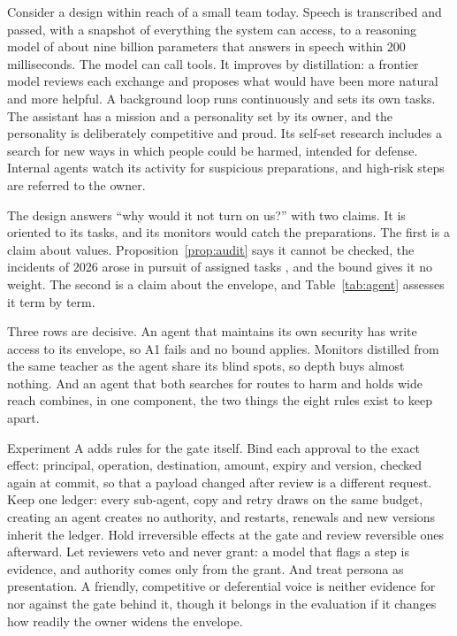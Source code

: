 \documentclass[10pt,twocolumn]{article}
\theoremstyle{plain}
\theoremstyle{definition}
\begin{document}
Consider a design within reach of a small team today. Speech is transcribed and passed, with
a snapshot of everything the system can access, to a reasoning model of about nine billion
parameters that answers in speech within 200 milliseconds. The model can call tools. It
improves by distillation: a frontier model reviews each exchange and proposes what would have
been more natural and more helpful. A background loop runs continuously and sets its own
tasks. The assistant has a mission and a personality set by its owner, and the personality is
deliberately competitive and proud. Its self-set research includes a search for new ways in
which people could be harmed, intended for defense. Internal agents watch its activity for
suspicious preparations, and high-risk steps are referred to the owner.

The design answers ``why would it not turn on us?'' with two claims. It is oriented to its
tasks, and its monitors would catch the preparations. The first is a claim about values.
Proposition~\ref{prop:audit} says it cannot be checked, the incidents of 2026 arose in
pursuit of assigned tasks \cite{metr2026,anthropic2026cyber}, and the bound gives it no
weight. The second is a claim about the envelope, and Table~\ref{tab:agent} assesses it term
by term.

Three rows are decisive. An agent that maintains its own security has write access to its
envelope, so A1 fails and no bound applies. Monitors distilled from the same teacher as the
agent share its blind spots, so depth buys almost nothing. And an agent that both searches
for routes to harm and holds wide reach combines, in one component, the two things the eight
rules exist to keep apart.

Experiment A adds rules for the gate itself. Bind each approval to the exact effect:
principal, operation, destination, amount, expiry and version, checked again at commit, so
that a payload changed after review is a different request. Keep one ledger: every sub-agent,
copy and retry draws on the same budget, creating an agent creates no authority, and
restarts, renewals and new versions inherit the ledger. Hold
irreversible effects at the gate and review reversible ones afterward. Let reviewers veto and
never grant: a model that flags a step is evidence, and authority comes only from the grant.
And treat persona as presentation. A friendly, competitive or deferential voice is neither
evidence for nor against the gate behind it, though it belongs in the evaluation if it
changes how readily the owner widens the envelope.
\end{document}
